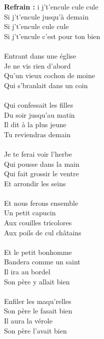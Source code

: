 
\noindent
\textbf{Refrain :}
i j't'encule cule cule
\\Si j't'encule jusqu'à demain
\\Si j't'encule cule cule
\\Si j't'encule c'est pour ton bien
\\\\Entrant dans une église
\\Je ne vis rien d'abord
\\Qu'un vieux cochon de moine
\\Qui s'branlait dans un coin
\\\\Qui confessait les filles
\\Du soir jusqu'au matin
\\Il dit à la plus jeune
\\Tu reviendras demain
\\\\Je te ferai voir l'herbe
\\Qui pousse dans la main
\\Qui fait grossir le ventre
\\Et arrondir les seins
\\\\Et nous ferons ensemble
\\Un petit capucin
\\Aux couilles tricolores
\\Aux poils de cul châtains
\\\\Et le petit bonhomme
\\Bandera comme un saint
\\Il ira au bordel
\\Son père y allait bien
\\\\Enfiler les maqu'relles
\\Son père le fasait bien
\\Il aura la vérole
\\Son père l'avait bien

\breakpage